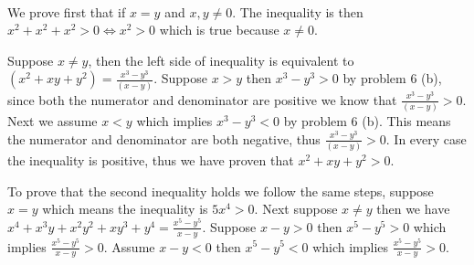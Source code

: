 \begin{problem} ~\\
\end{problem}

\begin{problem}
	We prove first that if $x=y$ and $x,y\neq 0$. The inequality is then $x^2+x^2+x^2>0 \iff x^2 >0$ which is true because $x\neq 0$.
	
	Suppose $x\neq y$, then the left side of inequality is equivalent to $(x^2+xy+y^2)=\frac{x^3-y^3}{(x-y)}$. Suppose $x>y$ then $x^3-y^3>0$ by problem 6 (b),  since both the numerator and denominator are positive we know that $\frac{x^3-y^3}{(x-y)}>0$. Next we assume $x < y$ which implies $x^3-y^3 < 0$ by problem 6 (b). This means the numerator and denominator are both negative, thus $\frac{x^3-y^3}{(x-y)}>0$. In every case the inequality is positive, thus we have proven that $x^2+xy+y^2>0$.
	
	To prove that the second inequality holds we follow the same steps, suppose $x=y$ which means the inequality is $5x^4>0$. Next suppose $x\neq y$ then we have $x^4+x^3y+x^2y^2+xy^3+y^4=\frac{x^5-y^5}{x-y}$. Suppose $x-y>0$ then $x^5-y^5>0$ which implies $\frac{x^5-y^5}{x-y}>0$. Assume $x-y<0$ then $x^5-y^5<0$ which implies $\frac{x^5-y^5}{x-y}>0$.
\end{problem}

\begin{problem}
\end{problem}
